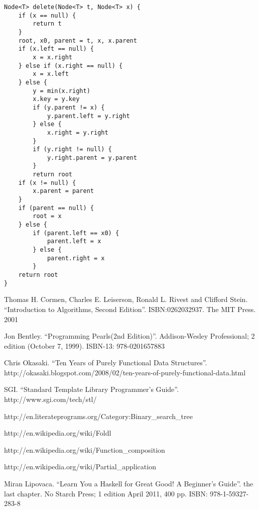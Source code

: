 \documentclass[b5paper]{article}
\begin{document}
\begin{lstlisting}
Node<T> delete(Node<T> t, Node<T> x) {
    if (x == null) {
        return t
    }
    root, x0, parent = t, x, x.parent
    if (x.left == null) {
        x = x.right
    } else if (x.right == null) {
        x = x.left
    } else {
        y = min(x.right)
        x.key = y.key
        if (y.parent != x) {
            y.parent.left = y.right
        } else {
            x.right = y.right
        }
        if (y.right != null) {
            y.right.parent = y.parent
        }
        return root
    if (x != null) {
        x.parent = parent
    }
    if (parent == null) {
        root = x
    } else {
        if (parent.left == x0) {
            parent.left = x
        } else {
            parent.right = x
        }
    return root
}
\end{lstlisting}

\begin{thebibliography}{99}

Thomas H. Cormen, Charles E. Leiserson, Ronald L. Rivest and Clifford Stein.
``Introduction to Algorithms, Second Edition''. ISBN:0262032937. The MIT Press. 2001

Jon Bentley. ``Programming Pearls(2nd Edition)''. Addison-Wesley Professional; 2 edition (October 7, 1999). ISBN-13: 978-0201657883

Chris Okasaki. ``Ten Years of Purely Functional Data Structures''. http://okasaki.blogspot.com/2008/02/ten-years-of-purely-functional-data.html

SGI. ``Standard Template Library Programmer's Guide''. http://www.sgi.com/tech/stl/

http://en.literateprograms.org/Category:Binary\_search\_tree

http://en.wikipedia.org/wiki/Foldl

http://en.wikipedia.org/wiki/Function\_composition

http://en.wikipedia.org/wiki/Partial\_application

Miran Lipovaca. ``Learn You a Haskell for Great Good! A Beginner's Guide''. the last chapter. No Starch Press; 1 edition April 2011, 400 pp. ISBN: 978-1-59327-283-8

\end{thebibliography}

\ifx\wholebook\relax\else
\end{document}
